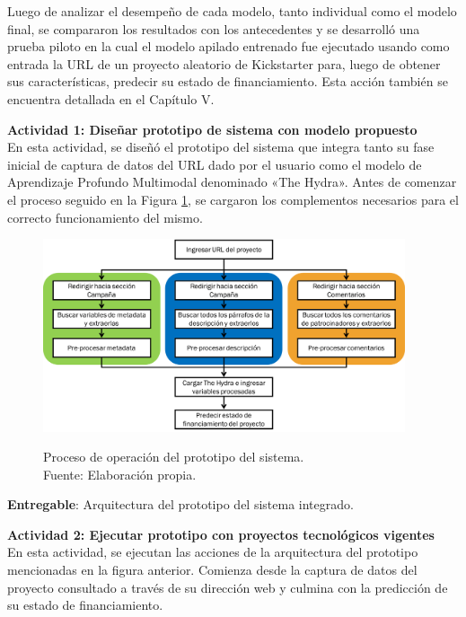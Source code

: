 Luego de analizar el desempeño de cada modelo, tanto individual como el modelo final, se compararon los resultados con los antecedentes y se desarrolló una prueba piloto en la cual el modelo apilado entrenado fue ejecutado usando como entrada la URL de un proyecto aleatorio de Kickstarter para, luego de obtener sus características, predecir su estado de financiamiento. Esta acción también se encuentra detallada en el Capítulo V.

\textbf{Actividad 1: Diseñar prototipo de sistema con modelo propuesto}
\\
En esta actividad, se diseñó el prototipo del sistema que integra tanto su fase inicial de captura de datos del URL dado por el usuario como el modelo de Aprendizaje Profundo Multimodal denominado «The Hydra». Antes de comenzar el proceso seguido en la Figura \ref{3:fig10}, se cargaron los complementos necesarios para el correcto funcionamiento del mismo.

\begin{figure}[h]
	\begin{center}
		\includegraphics[width=0.95\textwidth]{5/figures/demo_flux.png}
		\caption[Proceso de operación del prototipo del sistema]{Proceso de operación del prototipo del sistema.\\
			Fuente: Elaboración propia.}
		\vspace{-0.75cm}
		\label{3:fig10}
	\end{center}
\end{figure}

\textbf{Entregable}: Arquitectura del prototipo del sistema integrado.

\vspace{0.25cm}
\textbf{Actividad 2: Ejecutar prototipo con proyectos tecnológicos vigentes}
\\
En esta actividad, se ejecutan las acciones de la arquitectura del prototipo mencionadas en la figura anterior. Comienza desde la captura de datos del proyecto consultado a través de su dirección web y culmina con la predicción de su estado de financiamiento.

